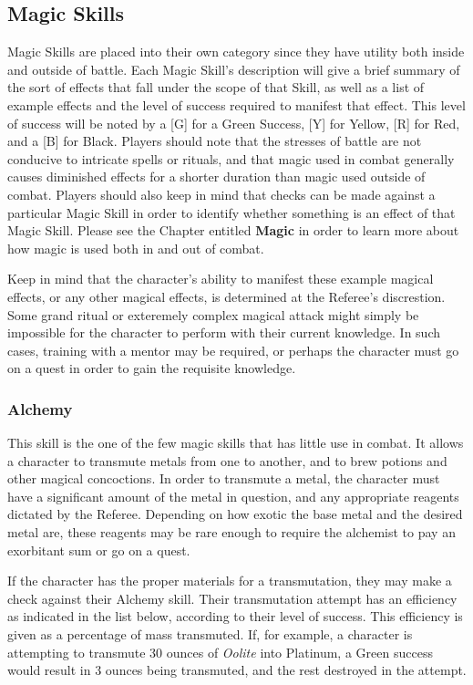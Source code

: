 \documentclass[oneside]{book}
\begin{document}
\begin{multicols}{2}
\section{Magic Skills}
Magic Skills are placed into their own category since they have utility both inside and outside of battle. Each Magic Skill's description will give a brief summary of the sort of effects that fall under the scope of that Skill, as well as a list of example effects and the level of success required to manifest that effect. This level of success will be noted by a [G] for a Green Success, [Y] for Yellow, [R] for Red, and a [B] for Black. Players should note that the stresses of battle are not conducive to intricate spells or rituals, and that magic used in combat generally causes diminished effects for a shorter duration than magic used outside of combat. Players should also keep in mind that checks can be made against a particular Magic Skill in order to identify whether something is an effect of that Magic Skill. Please see the Chapter entitled \textbf{Magic} in order to learn more about how magic is used both in and out of combat.

Keep in mind that the character's ability to manifest these example magical effects, or any other magical effects, is determined at the Referee's discrestion. Some grand ritual or exteremely complex magical attack might simply be impossible for the character to perform with their current knowledge. In such cases, training with a mentor may be required, or perhaps the character must go on a quest in order to gain the requisite knowledge. 

\subsubsection{Alchemy}
This skill is the one of the few magic skills that has little use in combat. It allows a character to transmute metals from one to another, and to brew potions and other magical concoctions. In order to transmute a metal, the character must have a significant amount of the metal in question, and any appropriate reagents dictated by the Referee. Depending on how exotic the base metal and the desired metal are, these reagents may be rare enough to require the alchemist to pay an exorbitant sum or go on a quest.

If the character has the proper materials for a transmutation, they may make a check against their Alchemy skill. Their transmutation attempt has an efficiency as indicated in the list below, according to their level of success. This efficiency is given as a percentage of mass transmuted. If, for example, a character is attempting to transmute 30 ounces of \emph{Oolite} into Platinum, a Green success would result in 3 ounces being transmuted, and the rest destroyed in the attempt. 


\end{multicols}
\end{document}

